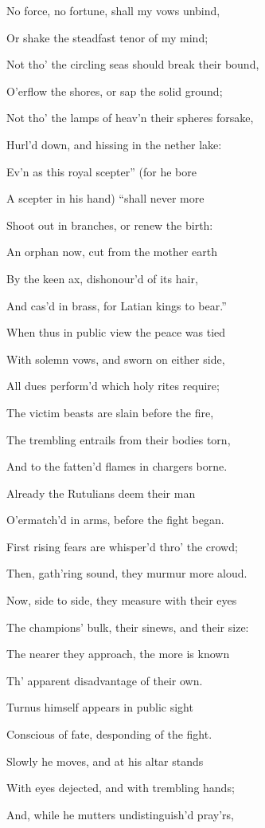 No force, no fortune, shall my vows unbind,

Or shake the steadfast tenor of my mind;

Not tho’ the circling seas should break their bound,

O’erflow the shores, or sap the solid ground;

Not tho’ the lamps of heav’n their spheres forsake,

Hurl’d down, and hissing in the nether lake:

Ev’n as this royal scepter” (for he bore

A scepter in his hand) “shall never more

Shoot out in branches, or renew the birth:

An orphan now, cut from the mother earth

By the keen ax, dishonour’d of its hair,

And cas’d in brass, for Latian kings to bear.”

When thus in public view the peace was tied

With solemn vows, and sworn on either side,

All dues perform’d which holy rites require;

The victim beasts are slain before the fire,

The trembling entrails from their bodies torn,

And to the fatten’d flames in chargers borne.

Already the Rutulians deem their man

O’ermatch’d in arms, before the fight began.

First rising fears are whisper’d thro’ the crowd;

Then, gath’ring sound, they murmur more aloud.

Now, side to side, they measure with their eyes

The champions’ bulk, their sinews, and their size:

The nearer they approach, the more is known

Th’ apparent disadvantage of their own.

Turnus himself appears in public sight

Conscious of fate, desponding of the fight.

Slowly he moves, and at his altar stands

With eyes dejected, and with trembling hands;

And, while he mutters undistinguish’d pray’rs,

